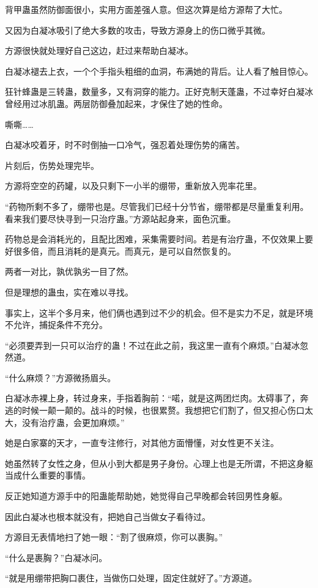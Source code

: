 \begin{this_body}
背甲蛊虽然防御面很小，实用方面差强人意。但这次算是给方源帮了大忙。

又因为白凝冰吸引了绝大多数的攻击，导致方源身上的伤口微乎其微。

方源很快就处理好自己这边，赶过来帮助白凝冰。

白凝冰褪去上衣，一个个手指头粗细的血洞，布满她的背后。让人看了触目惊心。

狂针蜂蛊是三转蛊，数量多，又有洞穿的能力。正好克制天蓬蛊，不过幸好白凝冰曾经用过冰肌蛊。两层防御叠加起来，才保住了她的性命。

嘶嘶……

白凝冰咬着牙，时不时倒抽一口冷气，强忍着处理伤势的痛苦。

片刻后，伤势处理完毕。

方源将空空的药罐，以及只剩下一小半的绷带，重新放入兜率花里。

“药物所剩不多了，绷带也是。尽管我们已经十分节省，绷带都是尽量重复利用。看来我们要尽快寻到一只治疗蛊。”方源站起身来，面色沉重。

药物总是会消耗光的，且配比困难，采集需要时间。若是有治疗蛊，不仅效果上要好很多倍，而且消耗的是真元。而真元，是可以自然恢复的。

两者一对比，孰优孰劣一目了然。

但是理想的蛊虫，实在难以寻找。

事实上，这半个多月来，他们俩也遇到过不少的机会。但不是实力不足，就是环境不允许，捕捉条件不充分。

“必须要弄到一只可以治疗的蛊！不过在此之前，我这里一直有个麻烦。”白凝冰忽然道。

“什么麻烦？”方源微扬眉头。

白凝冰赤裸上身，转过身来，手指着胸前：“喏，就是这两团烂肉。太碍事了，奔逃的时候一颠一颠的。战斗的时候，也很累赘。我想把它们割了，但又担心伤口太大，没有治疗蛊，会更加麻烦。”

她是白家寨的天才，一直专注修行，对其他方面懵懂，对女性更不关注。

她虽然转了女性之身，但从小到大都是男子身份。心理上也是无所谓，不把这身躯当成什么重要的事情。

反正她知道方源手中的阳蛊能帮助她，她觉得自己早晚都会转回男性身躯。

因此白凝冰也根本就没有，把她自己当做女子看待过。

方源目无表情地扫了她一眼：“割了很麻烦，你可以裹胸。”

“什么是裹胸？”白凝冰问。

“就是用绷带把胸口裹住，当做伤口处理，固定住就好了。”方源道。


\end{this_body}
